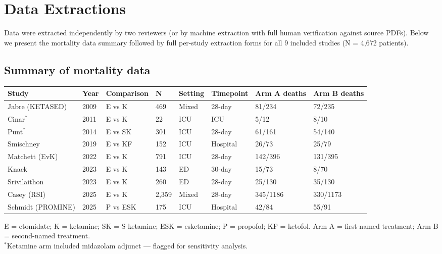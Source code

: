 \documentclass[11pt]{article}
\begin{document}
\newpage

\section{Data Extractions}
\label{sec:extractions}

Data were extracted independently by two reviewers (or by machine extraction with full human verification against source PDFs). Below we present the mortality data summary followed by full per-study extraction forms for all 9 included studies (N = 4,672 patients).

\subsection{Summary of mortality data}

\begin{table}[H]
\centering
\small
\begin{tabularx}{\textwidth}{L{2.8cm} C{0.6cm} L{2.6cm} C{0.7cm} C{1cm} C{1.4cm} C{1.4cm} C{1.4cm}}
\toprule
\textbf{Study} & \textbf{Year} & \textbf{Comparison} & \textbf{N} & \textbf{Setting} & \textbf{Timepoint} & \textbf{Arm A deaths} & \textbf{Arm B deaths} \\
\midrule
Jabre (KETASED) & 2009 & E vs K & 469 & Mixed & 28-day & 81/234 & 72/235 \\
Cinar$^{*}$ & 2011 & E vs K & 22 & ICU & ICU & 5/12 & 8/10 \\
Punt$^{*}$ & 2014 & E vs SK & 301 & ICU & 28-day & 61/161 & 54/140 \\
Smischney & 2019 & E vs KF & 152 & ICU & Hospital & 26/73 & 25/79 \\
Matchett (EvK) & 2022 & E vs K & 791 & ICU & 28-day & 142/396 & 131/395 \\
Knack & 2023 & E vs K & 143 & ED & 30-day & 15/73 & 8/70 \\
Srivilaithon & 2023 & E vs K & 260 & ED & 28-day & 25/130 & 35/130 \\
Casey (RSI) & 2025 & E vs K & 2,359 & Mixed & 28-day & 345/1186 & 330/1173 \\
Schmidt (PROMINE) & 2025 & P vs ESK & 175 & ICU & Hospital & 42/84 & 55/91 \\
\bottomrule
\end{tabularx}
\vspace{4pt}
\raggedright\footnotesize
E = etomidate; K = ketamine; SK = S-ketamine; ESK = esketamine; P = propofol; KF = ketofol. Arm A = first-named treatment; Arm B = second-named treatment.\\
$^{*}$Ketamine arm included midazolam adjunct --- flagged for sensitivity analysis.
\end{table}
\end{document}
